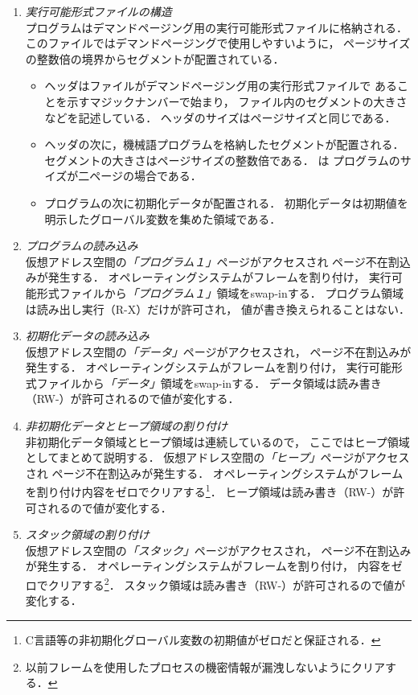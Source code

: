 \begin{enumerate}
\item \emph{実行可能形式ファイルの構造} \\
  プログラムはデマンドページング用の実行可能形式ファイルに格納される．
  このファイルではデマンドページングで使用しやすいように，
  ページサイズの整数倍の境界からセグメントが配置されている．
  \begin{itemize}
  \item ヘッダはファイルがデマンドページング用の実行形式ファイルで
    あることを示すマジックナンバーで始まり，
    ファイル内のセグメントの大きさなどを記述している．
    ヘッダのサイズはページサイズと同じである．
  \item ヘッダの次に，機械語プログラムを格納したセグメントが配置される．
    セグメントの大きさはページサイズの整数倍である．
    は
    プログラムのサイズが二ページの場合である．
  \item プログラムの次に初期化データが配置される．
    初期化データは初期値を明示したグローバル変数を集めた領域である．
  \end{itemize}
\item \emph{プログラムの読み込み} \\
  仮想アドレス空間の\emph{「プログラム１」}ページがアクセスされ
  ページ不在割込みが発生する．
  オペレーティングシステムがフレームを割り付け，
  実行可能形式ファイルから\emph{「プログラム１」}領域をswap-inする．
  プログラム領域は読み出し実行（R-X）だけが許可され，
  値が書き換えられることはない．
\item \emph{初期化データの読み込み} \\
  仮想アドレス空間の\emph{「データ」}ページがアクセスされ，
  ページ不在割込みが発生する．
  オペレーティングシステムがフレームを割り付け，
  実行可能形式ファイルから\emph{「データ」}領域をswap-inする．
  データ領域は読み書き（RW-）が許可されるので値が変化する．
\item \emph{非初期化データとヒープ領域の割り付け} \\
  非初期化データ領域とヒープ領域は連続しているので，
  ここではヒープ領域としてまとめて説明する．
  仮想アドレス空間の\emph{「ヒープ」}ページがアクセスされ
  ページ不在割込みが発生する．
  オペレーティングシステムがフレームを割り付け内容をゼロでクリアする\footnote{
  C言語等の非初期化グローバル変数の初期値がゼロだと保証される．}．
  ヒープ領域は読み書き（RW-）が許可されるので値が変化する．
\item \emph{スタック領域の割り付け} \\
  仮想アドレス空間の\emph{「スタック」}ページがアクセスされ，
  ページ不在割込みが発生する．
  オペレーティングシステムがフレームを割り付け，
  内容をゼロでクリアする\footnote{
  以前フレームを使用したプロセスの機密情報が漏洩しないようにクリアする．}．
  スタック領域は読み書き（RW-）が許可されるので値が変化する．
\end{enumerate}

